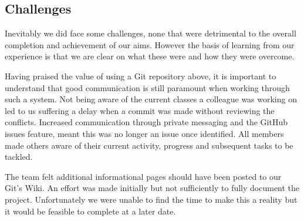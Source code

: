 \subsection{Challenges}
Inevitably we did face some challenges, none that were detrimental to the overall completion and achievement of our aims. However the basis of learning from our experience is that we are clear on what these were and how they were overcome. 

Having praised the value of using a Git repository above, it is important to understand that good communication is still paramount when working through such a system. Not being aware of the current classes a colleague was working on led to us suffering a delay when a commit was made without reviewing the conflicts. Increased communication through private messaging and the GitHub issues feature, meant this was no longer an issue once identified. All members made others aware of their current activity, progress and subsequent tasks to be tackled.

The team felt additional informational pages should have been posted to our Git's Wiki. An effort was made initially but not sufficiently to fully document the project. Unfortunately we were unable to find the time to make this a reality but it would be feasible to complete at a later date.


